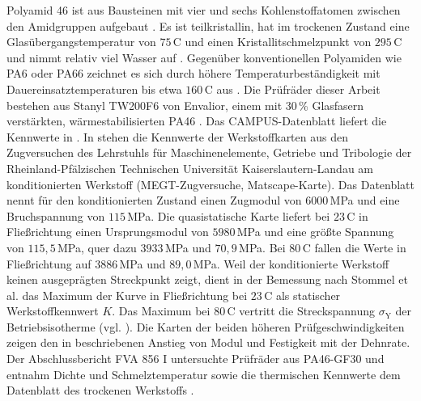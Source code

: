 Polyamid 46 ist aus Bausteinen mit vier und sechs Kohlenstoffatomen zwischen den Amidgruppen aufgebaut \cite[S.~45]{Erh08}. Es ist teilkristallin, hat im trockenen Zustand eine Glasübergangstemperatur von $75$\,\textdegree C und einen Kristallitschmelzpunkt von $295$\,\textdegree C und nimmt relativ viel Wasser auf \cite[S.~78]{Erh08}. Gegenüber konventionellen Polyamiden wie PA6 oder PA66 zeichnet es sich durch höhere Temperaturbeständigkeit mit Dauereinsatztemperaturen bis etwa $160$\,\textdegree C aus \cite[S.~66]{Has18}. Die Prüfräder dieser Arbeit bestehen aus Stanyl TW200F6 von Envalior, einem mit $30$\,\% Glasfasern verstärkten, wärmestabilisierten PA46 \cite{Env25}. Das CAMPUS-Datenblatt liefert die Kennwerte in  \cite{Env24}. In  stehen die Kennwerte der Werkstoffkarten aus den Zugversuchen des Lehrstuhls für Maschinenelemente, Getriebe und Tribologie der Rheinland-Pfälzischen Technischen Universität Kaiserslautern-Landau am konditionierten Werkstoff (MEGT-Zugversuche, Matscape-Karte). Das Datenblatt nennt für den konditionierten Zustand einen Zugmodul von $6000$\,MPa und eine Bruchspannung von $115$\,MPa. Die quasistatische Karte liefert bei $23$\,\textdegree C in Fließrichtung einen Ursprungsmodul von $5980$\,MPa und eine größte Spannung von $115{,}5$\,MPa, quer dazu $3933$\,MPa und $70{,}9$\,MPa. Bei $80$\,\textdegree C fallen die Werte in Fließrichtung auf $3886$\,MPa und $89{,}0$\,MPa. Weil der konditionierte Werkstoff keinen ausgeprägten Streckpunkt zeigt, dient in der Bemessung nach Stommel et al. das Maximum der Kurve in Fließrichtung bei $23$\,\textdegree C als statischer Werkstoffkennwert $K$. Das Maximum bei $80$\,\textdegree C vertritt die Streckspannung $\sigma_{\mathrm{Y}}$ der Betriebsisotherme (vgl. ). Die Karten der beiden höheren Prüfgeschwindigkeiten zeigen den in  beschriebenen Anstieg von Modul und Festigkeit mit der Dehnrate. Der Abschlussbericht FVA 856 I untersuchte Prüfräder aus PA46-GF30 und entnahm Dichte und Schmelztemperatur sowie die thermischen Kennwerte dem Datenblatt des trockenen Werkstoffs \cite[S.~105 bis 106]{FVA856-I}.

